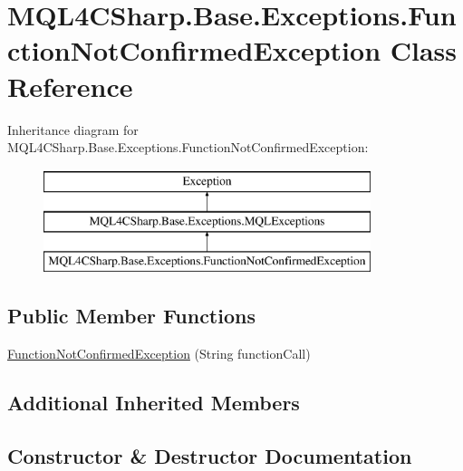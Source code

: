 \hypertarget{class_m_q_l4_c_sharp_1_1_base_1_1_exceptions_1_1_function_not_confirmed_exception}{}\section{M\+Q\+L4\+C\+Sharp.\+Base.\+Exceptions.\+Function\+Not\+Confirmed\+Exception Class Reference}
\label{class_m_q_l4_c_sharp_1_1_base_1_1_exceptions_1_1_function_not_confirmed_exception}
Inheritance diagram for M\+Q\+L4\+C\+Sharp.\+Base.\+Exceptions.\+Function\+Not\+Confirmed\+Exception\+:\begin{figure}[H]
\begin{center}
\leavevmode
\includegraphics[height=3.000000cm]{class_m_q_l4_c_sharp_1_1_base_1_1_exceptions_1_1_function_not_confirmed_exception}
\end{center}
\end{figure}
\subsection*{Public Member Functions}
\begin{DoxyCompactItemize}
\item 
\hyperlink{class_m_q_l4_c_sharp_1_1_base_1_1_exceptions_1_1_function_not_confirmed_exception_aafdc4a05676c50cafe64a1489c00dd12}{Function\+Not\+Confirmed\+Exception} (String function\+Call)
\end{DoxyCompactItemize}
\subsection*{Additional Inherited Members}


\subsection{Constructor \& Destructor Documentation}
